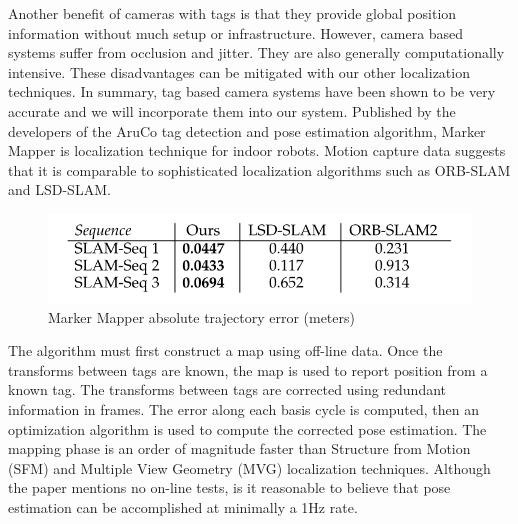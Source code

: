 \documentclass{article}
\begin{document}
  Another benefit of cameras with tags is that they provide global position information without much setup or infrastructure. However, camera based systems suffer from occlusion and jitter. They are also generally computationally intensive. These disadvantages can be mitigated with our other localization techniques. In summary, tag based camera systems have been shown to be very accurate and we will incorporate them into our system.
  Published by the developers of the AruCo tag detection and pose estimation algorithm, Marker Mapper is localization technique for indoor robots. Motion capture data suggests that it is comparable to sophisticated localization algorithms such as ORB-SLAM and LSD-SLAM\cite{munoz-salinas_rafael_mapping_2016}.
  \begin{figure}[H]
  	\centering
    \includegraphics[width=1\linewidth]{./images/mm_errors.png}
    \caption{Marker Mapper absolute trajectory error (meters)}
    \label{fig:mmResults}
  \end{figure}

  The algorithm must first construct a map using off-line data. Once the transforms between tags are known, the map is used to report position from a known tag. The transforms between tags are corrected using redundant information in frames. The error along each basis cycle is computed, then an optimization algorithm is used to compute the corrected pose estimation. The mapping phase is an order of magnitude faster than Structure from Motion (SFM) and Multiple View Geometry (MVG) localization techniques. Although the paper mentions no on-line tests, is it reasonable to believe that pose estimation can be accomplished at minimally a 1Hz rate.
\end{document}
